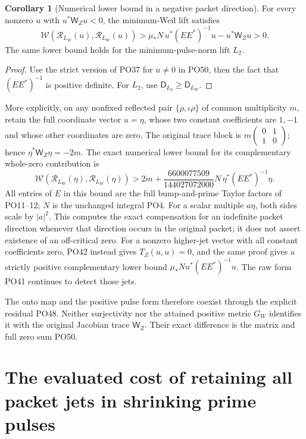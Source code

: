\documentclass[11pt,a4paper]{article}
\theoremstyle{definition}\newtheorem{definition}[theorem]{Definition}
\newtheorem{corollary}[theorem]{Corollary}
\begin{document}
\begin{corollary}[Numerical lower bound in a negative packet direction]
\label{PO:cor:negative}
For every nonzero \(u\) with \(u^*\mathsf W_Zu<0\),
the minimum-Weil lift satisfies
\[
 \mathcal W(\mathcal R_{L_W}(u),\mathcal R_{L_W}(u))
 >\mu_*N\,u^*(EE^*)^{-1}u-u^*\mathsf W_Zu>0.
 \tag{PO52}\label{PO:po:negative}
\]
The same lower bound holds for the minimum-pulse-norm lift \(L_2\).
\end{corollary}
\begin{proof}
Use the strict version of PO37 for \(u\ne0\) in PO50,
then the fact that \((EE^*)^{-1}\) is positive definite.
For \(L_2\), use \(\mathsf D_{L_2}\ge\mathsf D_{L_W}\).
\end{proof}

More explicitly, on any nonfixed reflected pair
\(\{\rho,\iota\rho\}\) of common multiplicity \(m\), retain the
full coordinate vector \(u=\eta\), whose two constant
coefficients are \(1,-1\) and whose other coordinates are zero.
The original trace block is
\(m\left(\begin{smallmatrix}0&1\\1&0\end{smallmatrix}\right)\);
hence \(\eta^*\mathsf W_Z\eta=-2m\).
The exact numerical lower bound for its complementary
whole-zero contribution is
\[
 \mathcal W(\mathcal R_{L_W}(\eta),\mathcal R_{L_W}(\eta))
 >2m+
    \frac{6600077509}{144027072000}
            N\,\eta^*(EE^*)^{-1}\eta .
 \tag{PO53}\label{PO:po:pair-bound}
\]
All entries of \(E\) in this bound are the full bump-and-prime
Taylor factors of PO11--12; \(N\) is the unchanged integral PO4.
For a scalar multiple \(a\eta\), both sides scale by \(|a|^2\).
This computes the exact compensation for an indefinite packet
direction whenever that direction occurs in the original packet;
it does not assert existence of an off-critical zero.
For a nonzero higher-jet vector with all constant coefficients
zero, PO42 instead gives \(T_Z(u,u)=0\), and the same proof gives
a strictly positive complementary lower bound
\(\mu_*N u^*(EE^*)^{-1}u\).
The raw form PO41 continues to detect those jets.

The onto map and the positive pulse form therefore coexist
through the explicit residual PO48. Neither surjectivity nor
the attained positive metric \(G_W\) identifies it with
the original Jacobian trace \(\mathsf W_Z\).
Their exact difference is the matrix and full zero sum PO50.


\section{The evaluated cost of retaining all packet jets in shrinking prime pulses}
\label{sec:pulse-packet-cost}
\end{document}
